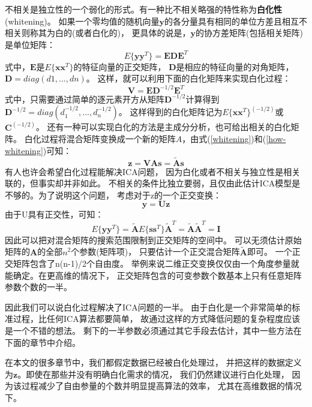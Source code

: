 不相关是独立性的一个弱化的形式。有一种比不相关略强的特性称为\textbf{白化性}(whitening)。
如果一个零均值的随机向量$\bm{y}$的各分量具有相同的单位方差且相互不相关则称其为白的(或者白化的)，
更具体的说是，$\bm{y}$的协方差矩阵(包括相关矩阵)是单位矩阵：
\begin{equation}
E\{\bm{yy}^T\}=\bm{EDE}^T
\label{whitening}
\end{equation}
式中，$\bm{E}$是$E\{\bm{xx}^T\}$的特征向量的正交矩阵，
$\bm{D}$是相应的特征向量的对角矩阵，$\bm{D}=diag(d1,...,dn)$。
这样，就可以利用下面的白化矩阵来实现白化过程：
\begin{equation}
\bm{V}=\bm{ED}^{-1/2}\bm{E}^T
\label{how-whitening}
\end{equation}
式中，只需要通过简单的逐元素开方从矩阵$\bm{D}^{-1/2}$计算得到
$\bm{D}^{-1/2}=diag(d_1^{-1/2},...,d_n^{-1/2})$。
这样得到的白化矩阵记为$E\{\bm{xx}^T\}^(-1/2)$或$\bm{C}^(-1/2)$。
还有一种可以实现白化的方法是主成分分析，也可给出相关的白化矩阵。
白化过程将混合矩阵变换成一个新的矩阵$A$，由式(\ref{whitening})和(\ref{how-whitening})可知：
\begin{equation}
\bm{z=VAs=\tilde{A}s}
\end{equation}
有人也许会希望白化过程能解决ICA问题，
因为白化或者不相关与独立性是相关联的，但事实却并非如此。
不相关的条件比独立要弱，且仅由此估计ICA模型是不够的。为了说明这个问题，
考虑对于z的一个正交变换：
\begin{equation}
\bm{y=Uz}
\end{equation}
由于U具有正交性，可知：
\begin{equation}
E\{\bm{yy}^T\}
=\tilde{\bm{A}}E\{\bm{ss}^T\}\tilde{\bm{A}}^T
=\tilde{\bm{A}}\tilde{\bm{A}}^T=\bm{I}
\end{equation}
因此可以把对混合矩阵的搜索范围限制到正交矩阵的空间中。
可以无须估计原始矩阵的$\bm{A}$的全部$n^2$个参数(矩阵项)，
只要估计一个正交混合矩阵$\tilde{\bm{A}}$即可。
一个正交矩阵包含了n(n-1)/2个自由度。
举例来说二维正交变换仅仅由一个角度参量就能确定。在更高维的情况下，
正交矩阵包含的可变参数个数基本上只有任意矩阵参数个数的一半。

因此我们可以说白化过程解决了ICA问题的一半。
由于白化是一个非常简单的标准过程，比任何ICA算法都要简单，
故通过这样的方式降低问题的复杂程度应该是一个不错的想法。
剩下的一半参数必须通过其它手段去估计，其中一些方法在下面的章节中介绍。

在本文的很多章节中，我们都假定数据已经被白化处理过，
并把这样的数据定义为$\bm{z}$。即使在那些并没有明确白化需求的情况，
我们仍然建议进行白化处理，
因为该过程减少了自由参量的个数并明显提高算法的效率，
尤其在高维数据的情况下。
   

